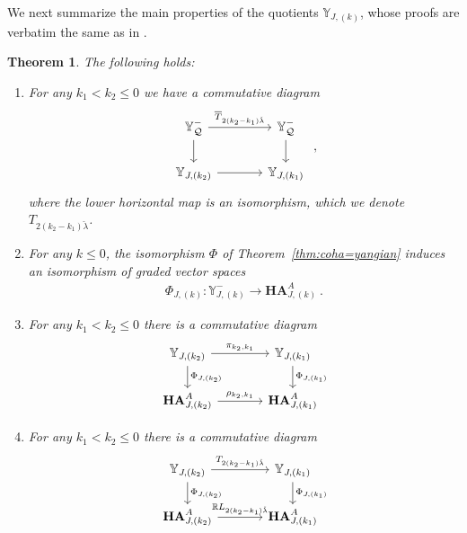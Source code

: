 \documentclass[reqno,a4paper]{amsart}
\newcommand{\R}{\mathbb{R}}
\newcommand{\Y}{\mathbb{Y}}
\newcommand{\qv}{\mathcal{Q}}
\newcommand{\Llambda}{{\check{\lambda}}}
\newcommand{\coha}{\mathbf{HA}}
\theoremstyle{basic-theorem}
\newtheorem{theorem}{Theorem}[section]
\numberwithin{equation}{section}
\begin{document}
We next summarize the main properties of the quotients $\Y_{J,(k)}$, whose proofs are verbatim the same as in \cite[\S\ref*{COHA-Yangian-subsec:quotients}]{DPSSV-3}.
\begin{theorem}\label{prop:quotients_affine_yangian}
The following holds:
	\begin{enumerate}\itemsep0.2cm
		\item For any $k_1<k_2\leq 0$ we have a commutative diagram
			\begin{align}
			\begin{tikzcd}[ampersand replacement=\&, column sep=large]
				\Y^-_\qv \ar{r}{\overline{T}_{2(k_2-k_1)\Llambda}} \ar{d}{} \& \Y^-_\qv \ar{d}{}\\
				\Y_{J, (k_2)}  \ar{r}{} \&
				\Y_{J, (k_1)} 
			\end{tikzcd}\ ,
		\end{align}
		where the lower horizontal map is an isomorphism, which we denote $T_{2(k_2-k_1)\Llambda}$.
		
		\item \label{item:quotients_affine_yangian_1}
		For any $k \leq 0$, the isomorphism $\Phi$ of Theorem~\ref{thm:coha=yangian} induces an isomorphism of graded vector spaces
		\begin{align}
			\Phi_{J,(k)}\colon \Y^-_{J,(k)} \longrightarrow \coha^A_{J,(k)}\ .
		\end{align}
		
		\item \label{item:quotients_affine_yangian_2}
		For any $k_1<k_2\leq 0$ there is a commutative diagram
		\begin{align}
			\begin{tikzcd}[ampersand replacement=\&, column sep=large]
			\Y_{J,(k_2)} \ar{r}{\pi_{k_2,k_1}} \ar{d}{\Phi_{J,(k_2)}} \& \Y_{J, (k_1)} \ar{d}{\Phi_{J,(k_1)}}\\
			\coha_{J, (k_2)}^A  \ar{r}{\rho_{k_2,k_1}} \&
			\coha_{J, (k_1)}^A 
			\end{tikzcd}
		\end{align}
		
		\item \label{item:quotients_affine_yangian_3}
		For any $k_1<k_2\leq 0$ there is a commutative diagram
		\begin{align}
			\begin{tikzcd}[ampersand replacement=\&, column sep=large]
			\Y_{J,(k_2)} \ar{r}{T_{2(k_2-k_1)\Llambda}} \ar{d}{\Phi_{J,(k_2)}} \& \Y_{J, (k_1)} \ar{d}{\Phi_{J,(k_1)}}\\
			\coha_{J, (k_2)}^A  \ar{r}{\R L_{2(k_2-k_1)\Llambda}} \&
			\coha_{J, (k_1)}^A 
		\end{tikzcd}
		\end{align}
	\end{enumerate}
\end{theorem}
\end{document}
